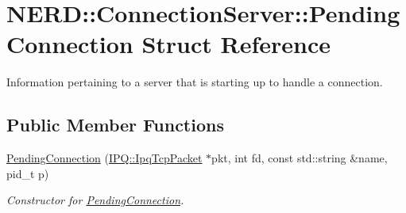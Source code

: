 \hypertarget{structNERD_1_1ConnectionServer_1_1PendingConnection}{
\section{\-N\-E\-R\-D\-:\-:\-Connection\-Server\-:\-:\-Pending\-Connection \-Struct \-Reference}
\label{structNERD_1_1ConnectionServer_1_1PendingConnection}
}


\-Information pertaining to a server that is starting up to handle a connection.  


\subsection*{\-Public \-Member \-Functions}
\begin{DoxyCompactItemize}
\item 
\hyperlink{structNERD_1_1ConnectionServer_1_1PendingConnection_a1380579c5d0abbc5faaf130e7f9ad1eb}{\-Pending\-Connection} (\hyperlink{classIPQ_1_1IpqTcpPacket}{\-I\-P\-Q\-::\-Ipq\-Tcp\-Packet} $\ast$pkt, int fd, const std\-::string \&name, pid\-\_\-t p)
\begin{DoxyCompactList}\small\item\em \-Constructor for \hyperlink{structNERD_1_1ConnectionServer_1_1PendingConnection}{\-Pending\-Connection}. \end{DoxyCompactList}\end{DoxyCompactItemize}
